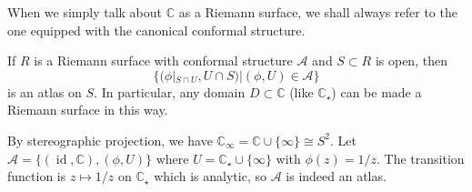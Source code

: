 When we simply talk about $\mathbb C$ as a Riemann surface, we shall always refer to the one equipped with the canonical conformal structure.
\begin{example}
    If $R$ is a Riemann surface with conformal structure $\mathcal A$ and $S\subset R$ is open, then
    $$\{(\phi|_{S\cap U},U\cap S)|(\phi,U)\in\mathcal A\}$$
    is an atlas on $S$.
    In particular, any domain $D\subset\mathbb C$ (like $\mathbb C_\star$) can be made a Riemann surface in this way.
\end{example}
\begin{example}
    By stereographic projection, we have $\mathbb C_\infty=\mathbb C\cup\{\infty\}\cong S^2$.
    Let $\mathcal A=\{(\operatorname{id},\mathbb C),(\phi,U)\}$ where $U=\mathbb C_\star\cup\{\infty\}$ with $\phi(z)=1/z$.
    The transition function is $z\mapsto 1/z$ on $\mathbb C_\star$ which is analytic, so $\mathcal A$ is indeed an atlas.
\end{example}